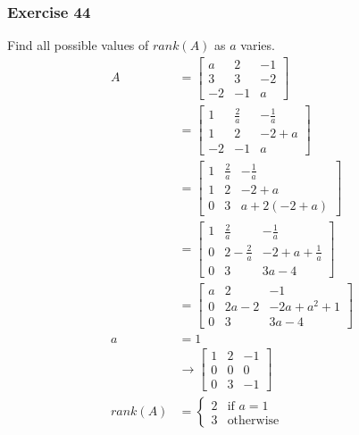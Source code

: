 \documentclass[letterpaper, 12pt]{math}
\begin{document}
\subsubsection*{Exercise 44}
Find all possible values of \( rank(A) \) as \( a \) varies.
\begin{align*}
  A &= \begin{bmatrix}
    a & 2 & -1 \\
    3 & 3 & -2 \\
    -2 & -1 & a
  \end{bmatrix} \\
  &= \begin{bmatrix}
    1 & \frac{2}{a} & -\frac{1}{a} \\
    1 & 2 & -2+a \\
    -2 & -1 & a
  \end{bmatrix} \\
  &= \begin{bmatrix}
    1 & \frac{2}{a} & -\frac{1}{a} \\
    1 & 2 & -2+a \\
    0 & 3 & a+2(-2+a)
  \end{bmatrix} \\
  &= \begin{bmatrix}
    1 & \frac{2}{a} & -\frac{1}{a} \\
    0 & 2-\frac{2}{a} & -2+a+\frac{1}{a} \\
    0 & 3 & 3a-4
  \end{bmatrix} \\
  &= \begin{bmatrix}
    a & 2 & -1 \\
    0 & 2a-2 & -2a+a^2+1 \\
    0 & 3 & 3a-4
  \end{bmatrix} \\
  a &= 1 \\
  &\to \begin{bmatrix}
    1 & 2 & -1 \\
    0 & 0 & 0 \\
    0 & 3 & -1
  \end{bmatrix} \\
  rank(A) &= \begin{cases}
    2 & \text{if } a = 1 \\
    3 & \text{otherwise}
  \end{cases}
\end{align*}
\end{document}

